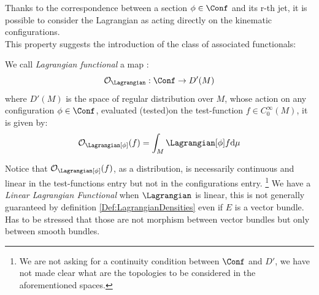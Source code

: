 \documentclass[Main]{subfiles}
\begin{document}
	
	Thanks to the correspondence between a section $\phi \in \Conf$ and its r-th jet, it is possible to consider the Lagrangian as acting directly on the kinematic configurations.
	\\
	This property suggests the introduction of the class of associated functionals:
	\begin{definition}\label{Def:LagrangianFunctionals}
		We call \emph{Lagrangian functional} a map :
		\begin{displaymath}
			\mathcal{O}_\Lagrangian : \Conf \rightarrow D'(M) 
		\end{displaymath}			
		where  $D'(M)$ is the space of regular distribution over $M$, %
		whose action on any configuration $\phi \in \Conf$, evaluated \ifToninus (tested)\fi on the test-function $f \in C^\infty_0(M)$, it is given by:
		\begin{displaymath}
			\mathcal{O}_\Lagrangian [\phi] (f) = \int_M \Lagrangian [\phi] f \textrm{d}\mu
		\end{displaymath}		
	\end{definition}	
	Notice that $\mathcal{O}_\Lagrangian [\phi] (f)$, as a distribution, 
	is necessarily continuous and linear in the test-functions entry  but not in the configurations entry. 
	\footnote{We are not asking for a continuity condition between $\Conf$ and $D'$, we have not made clear what are the topologies to be considered in the aforementioned spaces.}
	We have a \emph{Linear Lagrangian Functional} when $\Lagrangian$ is linear, this is not generally guaranteed by definition \ref{Def:LagrangianDensities} even if $E$ is a vector bundle. Has to be stressed that those are not morphism between vector bundles but only between smooth bundles.
\end{document}
